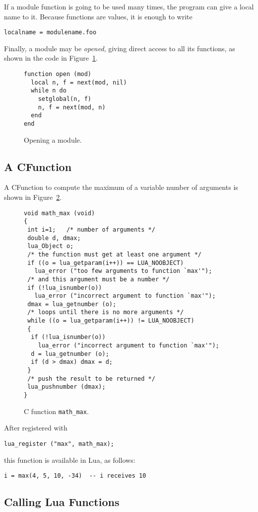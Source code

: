 If a module function is going to be used many times,
the program can give a local name to it.
Because functions are values, it is enough to write
\begin{verbatim}
localname = modulename.foo
\end{verbatim}
Finally, a module may be {\em opened},
giving direct access to all its functions,
as shown in the code in Figure~\ref{openmod}.
\begin{figure}
\Line
\begin{verbatim}
function open (mod)
  local n, f = next(mod, nil)
  while n do
    setglobal(n, f)
    n, f = next(mod, n)
  end
end
\end{verbatim}
\caption{Opening a module.\label{openmod}}
\Line
\end{figure}

\subsection{A CFunction} \label{exCFunction}
A CFunction to compute the maximum of a variable number of arguments
is shown in Figure~\ref{Cmax}.
\begin{figure}
\Line
\begin{verbatim}
void math_max (void)
{
 int i=1;   /* number of arguments */
 double d, dmax;
 lua_Object o;
 /* the function must get at least one argument */
 if ((o = lua_getparam(i++)) == LUA_NOOBJECT)
   lua_error ("too few arguments to function `max'");
 /* and this argument must be a number */
 if (!lua_isnumber(o))
   lua_error ("incorrect argument to function `max'");
 dmax = lua_getnumber (o);
 /* loops until there is no more arguments */
 while ((o = lua_getparam(i++)) != LUA_NOOBJECT)
 {
  if (!lua_isnumber(o))
    lua_error ("incorrect argument to function `max'");
  d = lua_getnumber (o);
  if (d > dmax) dmax = d;
 }
 /* push the result to be returned */
 lua_pushnumber (dmax);
}
\end{verbatim}
\caption{C function {\tt math\_max}.\label{Cmax}}
\Line
\end{figure}
After registered with
\begin{verbatim}
lua_register ("max", math_max);
\end{verbatim}
this function is available in Lua, as follows:
\begin{verbatim}
i = max(4, 5, 10, -34)  -- i receives 10
\end{verbatim}


\subsection{Calling Lua Functions} \label{exLuacall}

